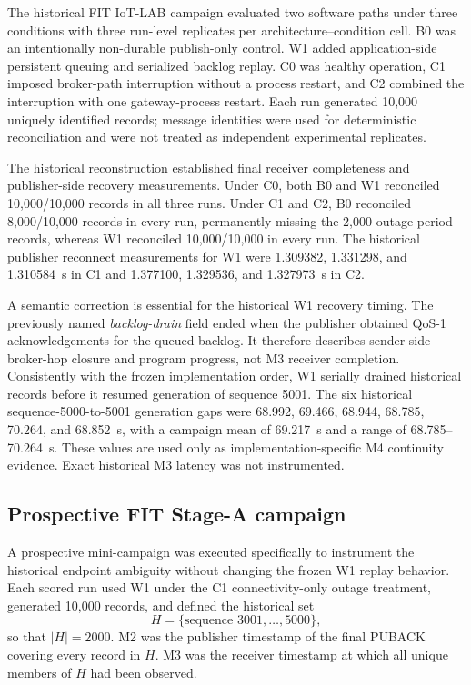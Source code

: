 \documentclass[journal]{IEEEtran}
\begin{document}
The historical FIT IoT-LAB campaign \cite{fitlab} evaluated two software paths under three conditions with three run-level replicates per architecture--condition cell. B0 was an intentionally non-durable publish-only control. W1 added application-side persistent queuing and serialized backlog replay. C0 was healthy operation, C1 imposed broker-path interruption without a process restart, and C2 combined the interruption with one gateway-process restart. Each run generated 10,000 uniquely identified records; message identities were used for deterministic reconciliation and were not treated as independent experimental replicates.

The historical reconstruction established final receiver completeness and publisher-side recovery measurements. Under C0, both B0 and W1 reconciled 10,000/10,000 records in all three runs. Under C1 and C2, B0 reconciled 8,000/10,000 records in every run, permanently missing the 2,000 outage-period records, whereas W1 reconciled 10,000/10,000 in every run. The historical publisher reconnect measurements for W1 were 1.309382, 1.331298, and 1.310584~s in C1 and 1.377100, 1.329536, and 1.327973~s in C2.

A semantic correction is essential for the historical W1 recovery timing. The previously named \emph{backlog-drain} field ended when the publisher obtained QoS-1 acknowledgements for the queued backlog. It therefore describes sender-side broker-hop closure and program progress, not M3 receiver completion. Consistently with the frozen implementation order, W1 serially drained historical records before it resumed generation of sequence 5001. The six historical sequence-5000-to-5001 generation gaps were 68.992, 69.466, 68.944, 68.785, 70.264, and 68.852~s, with a campaign mean of 69.217~s and a range of 68.785--70.264~s. These values are used only as implementation-specific M4 continuity evidence. Exact historical M3 latency was not instrumented.

\subsection{Prospective FIT Stage-A campaign}

A prospective mini-campaign was executed specifically to instrument the historical endpoint ambiguity without changing the frozen W1 replay behavior. Each scored run used W1 under the C1 connectivity-only outage treatment, generated 10,000 records, and defined the historical set
\[
H=\{\text{sequence }3001,\ldots,5000\},
\]
so that $|H|=2000$. M2 was the publisher timestamp of the final PUBACK covering every record in $H$. M3 was the receiver timestamp at which all unique members of $H$ had been observed.
\end{document}
